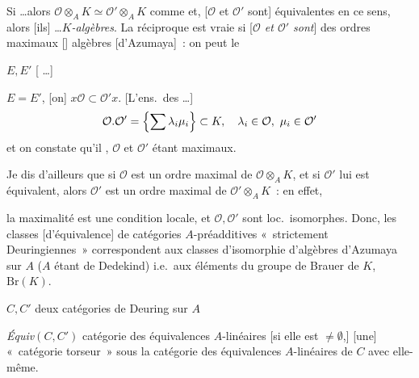 \documentclass[11pt,a4paper]{article}
\begin{document}
 Si …alors
$\mathcal{O} \otimes_A K \simeq \mathcal{O}' \otimes_{A} K$ comme  et, [$\mathcal{O}$ et
$\mathcal{O}'$ sont] équivalentes en ce sens, alors [ils]  …\emph{$K$-algèbres}. La
réciproque est vraie si \struck{\ill{}} [\emph{$\mathcal{O}$ et $\mathcal{O}'$ sont}] des ordres
maximaux  [\ill{}] algèbres  [d'Azumaya]~: on peut le

$E, E'$  [ …] 

$E = E'$,  \ill{} [on] \struck{\ill{}} 
$x\mathcal{O} \subset \mathcal{O}' x$. [L'ens.\ des …]
\[
  \mathcal{O} . \mathcal{O}' = \Bigl\{ \sum \lambda_i \mu_i \Bigr\} \subset K, \quad
  \lambda_i \in \mathcal{O}, \ \mu_i \in \mathcal{O}'
\]
et on constate qu'il , $\mathcal{O}$ et $\mathcal{O}'$ étant maximaux.

 Je dis d'ailleurs que si $\mathcal{O}$ est un ordre maximal de
$\mathcal{O} \otimes_A K$, et si $\mathcal{O}'$ lui est équivalent, alors $\mathcal{O}'$ est un ordre
maximal de $\mathcal{O}' \otimes_A K$~: en effet,

la maximalité est une condition locale, et $\mathcal{O}, \mathcal{O}'$ sont loc.\ isomorphes. Donc, les
classes  [d'équivalence] de catégories $A$-préadditives «~strictement
Deuringiennes~» correspondent aux classes d'isomorphie d'algèbres d'Azumaya  sur $A$
($A$ étant de Dedekind) i.e.\ aux éléments du groupe de Brauer de $K$, $\mathrm{Br}(K)$.

$C, C'$ deux catégories de Deuring sur $A$

\emph{Équiv}$(C, C')$ catégorie des équivalences $A$-linéaires [si elle est $\neq \emptyset$,]
 \struck{\ill{}} [une] «~catégorie torseur~» sous la catégorie des équivalences
$A$-linéaires de $C$ avec elle-même.
\end{document}
